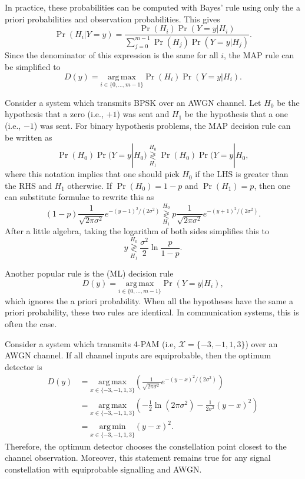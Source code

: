 In practice, these probabilities can be computed with Bayes' rule using only the a priori probabilities and observation probabilities.
This gives
\[ \Pr \left(H_i | Y=y \right) =
\frac{\Pr(H_i) \Pr (Y=y | H_i) }{\sum_{j=0}^{m-1} \Pr(H_j) \Pr (Y=y | H_j)}. \]
Since the denominator of this expression is the same for all $i$, the MAP rule can be simplified to
\[ D(y) = \underset{i\in\{0,\ldots,m-1\}}{\mathrm{arg\,max}} \Pr(H_i) \Pr (Y=y | H_i). \]

\begin{example}
Consider a system which transmits BPSK over an AWGN channel.
Let $H_0$ be the hypothesis that a zero (i.e., $+1$) was sent and $H_1$ be the hypothesis that a one (i.e., $-1$) was sent.
For binary hypothesis problems, the MAP decision rule can be written as
\[ \Pr (H_0) \Pr (Y=y | H_0) \underset{H_1}{\overset{H_0}{\gtrless}}  \Pr (H_0) \Pr (Y=y | H_0, \]
where this notation implies that one should pick $H_0$ if the LHS is greater than the RHS and $H_1$ otherwise.
If $\Pr(H_0) = 1-p$ and $\Pr (H_1) = p$, then one can substitute formulae to rewrite this as
\[ (1-p)  \frac{1}{\sqrt{2\pi \sigma^2}} e^{-(y-1)^2 / (2\sigma^2)} \underset{H_1}{\overset{H_0}{\gtrless}}  p \frac{1}{\sqrt{2\pi \sigma^2}} e^{-(y+1)^2 / (2\sigma^2)}.\]
After a little algebra, taking the logarithm of both sides simplifies this to 
\[ y \underset{H_1}{\overset{H_0}{\gtrless}} \frac{\sigma^2}{2}  \ln \frac{p}{1-p}.\]
\end{example}

Another popular rule is the  (ML) decision rule
\[ D(y) = \underset{i\in\{0,\ldots,m-1\}}{\mathrm{arg\,max}} \Pr (Y=y | H_i), \]
which ignores the a priori probability.
When all the hypotheses have the same a priori probability, these two rules are identical.
In communication systems, this is often the case.

\begin{example}
Consider a system which transmits 4-PAM (i.e, $\mathcal{X}=\{-3,-1,1,3\}$) over an AWGN channel.
If all channel inputs are equiprobable, then the optimum detector is
\begin{align*}
D(y)
& =  \underset{x\in\{-3,-1,1,3\}}{\mathrm{arg\,max}} \left( \frac{1}{\sqrt{2\pi \sigma^2}} e^{-(y-x)^2 / (2\sigma^2)} \right) \\
& =  \underset{x\in\{-3,-1,1,3\}}{\mathrm{arg\,max}} \left(-\frac{1}{2}\ln(2\pi \sigma^2) - \frac{1}{2\sigma^2} (y-x)^2 \right) \\
& =  \underset{x\in\{-3,-1,1,3\}}{\mathrm{arg\,min}} (y-x)^2. 
\end{align*}
Therefore, the optimum detector chooses the constellation point closest to the channel observation.
Moreover, this statement remains true for any signal constellation with equiprobable signalling and AWGN.
\end{example}

